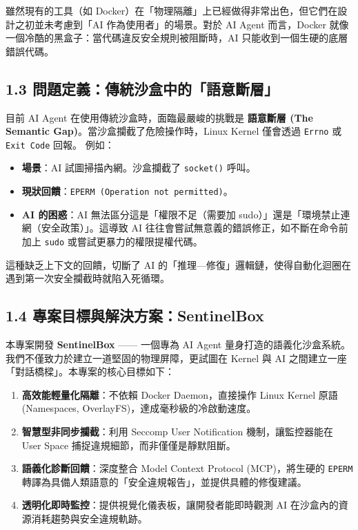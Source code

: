 \documentclass[12pt, a4paper, twoside]{article}
\begin{document}
雖然現有的工具（如 Docker）在「物理隔離」上已經做得非常出色，但它們在設計之初並未考慮到「AI 作為使用者」的場景。對於 AI Agent 而言，Docker 就像一個冷酷的黑盒子：當代碼違反安全規則被阻斷時，AI 只能收到一個生硬的底層錯誤代碼。

\subsection{1.3 問題定義：傳統沙盒中的「語意斷層」}
目前 AI Agent 在使用傳統沙盒時，面臨最嚴峻的挑戰是 \textbf{語意斷層 (The Semantic Gap)}。當沙盒攔截了危險操作時，Linux Kernel 僅會透過 \texttt{Errno} 或 \texttt{Exit Code} 回報。
例如：
\begin{itemize}
    \item \textbf{場景}：AI 試圖掃描內網。沙盒攔截了 \texttt{socket()} 呼叫。
    \item \textbf{現狀回饋}：\texttt{EPERM (Operation not permitted)}。
    \item \textbf{AI 的困惑}：AI 無法區分這是「權限不足（需要加 sudo）」還是「環境禁止連網（安全政策）」。這導致 AI 往往會嘗試無意義的錯誤修正，如不斷在命令前加上 \texttt{sudo} 或嘗試更暴力的權限提權代碼。
\end{itemize}
這種缺乏上下文的回饋，切斷了 AI 的「推理—修復」邏輯鏈，使得自動化迴圈在遇到第一次安全攔截時就陷入死循環。

\subsection{1.4 專案目標與解決方案：SentinelBox}
本專案開發 \textbf{SentinelBox} —— 一個專為 AI Agent 量身打造的語義化沙盒系統。我們不僅致力於建立一道堅固的物理屏障，更試圖在 Kernel 與 AI 之間建立一座「對話橋樑」。本專案的核心目標如下：
\begin{enumerate}
    \item \textbf{高效能輕量化隔離}：不依賴 Docker Daemon，直接操作 Linux Kernel 原語 (Namespaces, OverlayFS)，達成毫秒級的冷啟動速度。
    \item \textbf{智慧型非同步攔截}：利用 Seccomp User Notification 機制，讓監控器能在 User Space 捕捉違規細節，而非僅僅是靜默阻斷。
    \item \textbf{語義化診斷回饋}：深度整合 Model Context Protocol (MCP)，將生硬的 \texttt{EPERM} 轉譯為具備人類語意的「安全違規報告」，並提供具體的修復建議。
    \item \textbf{透明化即時監控}：提供視覺化儀表板，讓開發者能即時觀測 AI 在沙盒內的資源消耗趨勢與安全違規軌跡。
\end{enumerate}
\end{document}
